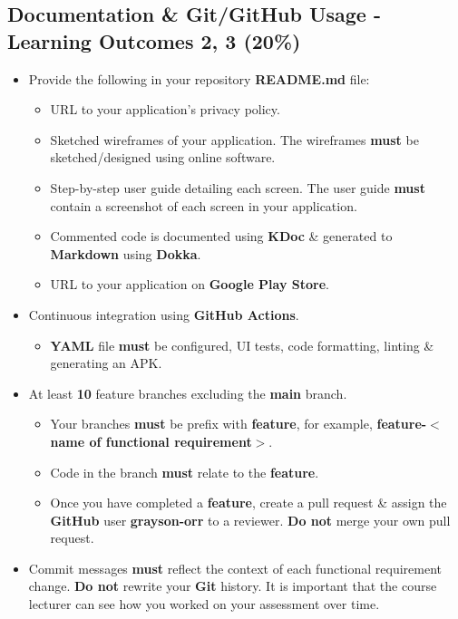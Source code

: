 \documentclass{article}
\begin{document}
\subsection*{Documentation \& Git/GitHub Usage - Learning Outcomes 2, 3 (20\%)}
\begin{itemize}
	\item Provide the following in your repository \textbf{README.md} file:
	      \begin{itemize}
	      	\item URL to your application's privacy policy.
	      	\item Sketched wireframes of your application. The wireframes \textbf{must} be sketched/designed using online software. 
	      	\item Step-by-step user guide detailing each screen. The user guide \textbf{must} contain a screenshot of each screen in your application.
	      	\item Commented code is documented using \textbf{KDoc} \& generated to \textbf{Markdown} using \textbf{Dokka}.
	      	\item URL to your application on \textbf{Google Play Store}.
	      \end{itemize}
	\item Continuous integration using \textbf{GitHub Actions}.
	      \begin{itemize}
	      	\item \textbf{YAML} file \textbf{must} be configured, UI tests, code formatting, linting \& generating an APK.
	      \end{itemize}  			
	\item At least \textbf{10} feature branches excluding the \textbf{main} branch.
	      \begin{itemize}
	      	\item Your branches \textbf{must} be prefix with \textbf{feature}, for example, \textbf{feature-$<$name of functional requirement$>$}.
	      	\item Code in the branch \textbf{must} relate to the \textbf{feature}.
	      	\item Once you have completed a \textbf{feature}, create a pull request \& assign the \textbf{GitHub} user \textbf{grayson-orr} to a reviewer. \textbf{Do not} merge your own pull request.
	      \end{itemize}
	\item Commit messages \textbf{must} reflect the context of each functional requirement change. \textbf{Do not} rewrite your \textbf{Git} history. It is important that the course lecturer can see how you worked on your assessment over time.
\end{itemize}
\end{document}
